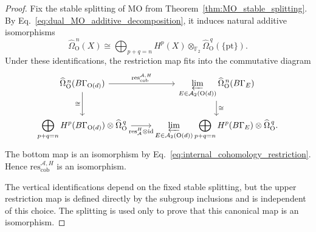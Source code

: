 \documentclass[aps,prx,reprint,superscriptaddress,twocolumn,amsmath,amssymb,amsfonts, nofootinbib]{revtex4-2}
\newcommand{\res}{\text{res}}
\theoremstyle{apsstyle}
\begin{document}
\begin{proof}
Fix the stable splitting of $\mathrm{MO}$ from
Theorem~\ref{thm:MO_stable_splitting}. By
Eq.~\eqref{eq:dual_MO_additive_decomposition}, it induces natural
additive isomorphisms
\begin{equation*}
    \widehat{\Omega}_{\mathrm O}^{\,n}(X)
    \cong
    \bigoplus_{p+q=n}
    H^p(X)\otimes_{\mathbb F_2}
    \widehat{\Omega}_{\mathrm O}^{\,q}(\{\mathrm{pt}\}).
\end{equation*}
Under these identifications, the restriction map fits into the
commutative diagram
\begin{equation}
\begin{tikzcd}
\widehat{\Omega}_{\mathrm O}^{\,n}(B\Gamma_{\mathrm{O}(d)})
\arrow[r,"\res_{\mathrm{cob}}^{\mathcal A,H}"]
\arrow[d,"\cong"']
&
\displaystyle
\varprojlim_{E\in\mathcal A_2(\mathrm O(d))}
\widehat{\Omega}_{\mathrm O}^{\,n}(B\Gamma_E)
\arrow[d,"\cong"]
\\
\displaystyle
\bigoplus_{p+q=n}
H^p(B\Gamma_{\mathrm{O}(d)})\otimes
\widehat{\Omega}_{\mathrm O}^{\,q}
\arrow[r,"\res_{\mathcal A}^{H}\otimes\mathrm{id}"']
&
\displaystyle
\varprojlim_{E\in\mathcal A_2(\mathrm O(d))}
\bigoplus_{p+q=n}
H^p(B\Gamma_E)\otimes
\widehat{\Omega}_{\mathrm O}^{\,q}.
\end{tikzcd}
\label{eq:cobordism_restriction_internal_diagram}
\end{equation}
The bottom map is an isomorphism by
Eq.~\eqref{eq:internal_cohomology_restriction}. Hence
$\res_{\mathrm{cob}}^{\mathcal A,H}$ is an isomorphism.

The vertical identifications depend on the fixed stable splitting, but
the upper restriction map is defined directly by the subgroup
inclusions and is independent of this choice. The splitting is used
only to prove that this canonical map is an isomorphism.
\end{proof}


\bigskip 
\end{document}
